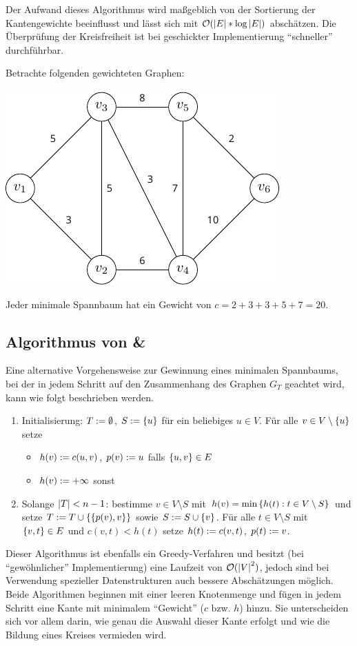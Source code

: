 Der Aufwand dieses Algorithmus wird maßgeblich von der Sortierung der Kantengewichte beeinflusst und lässt sich mit $\mathcal{O}(\left| E \right| * \log\left| E \right|)$ abschätzen. Die Überprüfung der Kreisfreiheit ist bei geschickter Implementierung \enquote{schneller} durchführbar.

\begin{beispiel}
	Betrachte folgenden gewichteten Graphen:
	\begin{center}
		\includegraphics[width=.3\textwidth]{img/optinum_5_2_bsp5-1.pdf}
	\end{center}

	Jeder minimale Spannbaum hat ein Gewicht von $c = 2+3+3+5+7 = 20$.
\end{beispiel}

\subsection{Algorithmus von  \& }

Eine alternative Vorgehensweise zur Gewinnung eines minimalen Spannbaums, bei der in jedem Schritt auf den Zusammenhang des Graphen $G_T$ geachtet wird, kann wie folgt beschrieben werden.

\begin{enumerate}[label=Schritt \arabic*:, leftmargin=*, start=0]
	\item Initialisierung: $T \mathrel{:=} \emptyset$, $S \mathrel{:=} \left\{ u \right\}$ für ein beliebiges $u \in V$. Für alle $v \in V \setminus \left\{ u \right\}$ setze
	\begin{itemize}[nolistsep, topsep=-\parskip]
		\item $h(v) \mathrel{:=} c(u,v)$, $p(v) \mathrel{:=} u$ \hspace{1em} falls $\left\{ u,v \right\} \in E$
		\item $h(v) \mathrel{:=} + \infty$ \hspace{1em} sonst
	\end{itemize}
	\item Solange $\left| T \right| < n -1$: bestimme $v \in V \setminus S$ mit $h(v) = \min\left\{ h(t) : t \in V \setminus S \right\}$ und setze $T \mathrel{:=} T \cup \left\{ \left\{ p(v),v \right\} \right\}$ sowie $S \mathrel{:=} S \cup \left\{ v \right\}$. Für alle $t \in V \setminus S$ mit $\left\{ v,t \right\} \in E$ und $c(v,t) < h(t)$ setze $h(t) \mathrel{:=} c(v,t)$, $p(t) \mathrel{:=} v$.
\end{enumerate}

Dieser Algorithmus ist ebenfalls ein Greedy-Verfahren und besitzt (bei \enquote{gewöhnlicher} Implementierung) eine Laufzeit von $\mathcal{O}(\left| V \right|^2)$, jedoch sind bei Verwendung spezieller Datenstrukturen auch bessere Abschätzungen möglich. Beide Algorithmen beginnen mit einer leeren Knotenmenge und fügen in jedem Schritt eine Kante mit minimalem \enquote{Gewicht} ($c$ bzw. $h$) hinzu. Sie unterscheiden sich vor allem darin, wie genau die Auswahl dieser Kante erfolgt und wie die Bildung eines Kreises vermieden wird.
